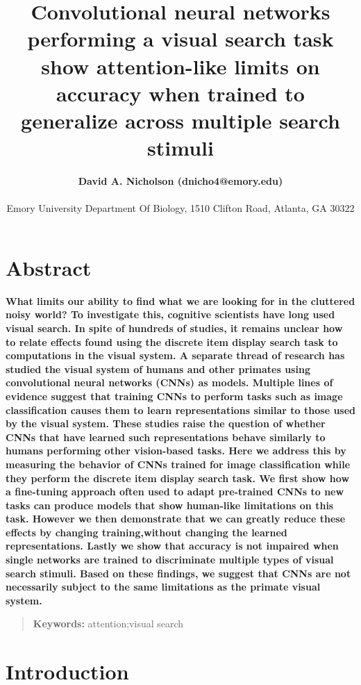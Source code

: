 \documentclass[10pt,letterpaper]{article}
\title{Convolutional neural networks performing a visual search task show attention-like 
limits on accuracy when trained to generalize across multiple search stimuli}
\author{{\large \bf David A. Nicholson (dnicho4@emory.edu)} \\
  \AND {\large \bf Astrid A. Prinz (astrid.prinz@emory.edu)} \\
  Emory University Department Of Biology, 1510 Clifton Road, Atlanta, GA 30322}
\begin{document}
\maketitle

\section{Abstract}
{
\bf
What limits our ability to find what we are looking for in the cluttered noisy world? To investigate this, cognitive scientists have long used visual search. In spite of hundreds of studies, it remains unclear how to relate effects found using the discrete item display search task to computations in the visual system. A separate thread of research has studied the visual system of humans and other primates using convolutional neural networks (CNNs) as models. Multiple lines of evidence suggest that training CNNs to perform tasks such as image classification causes them to learn  representations similar to those used by the visual system. These studies raise the question of whether CNNs that have learned such representations behave similarly to humans performing other vision-based tasks. Here we address this by measuring the behavior of CNNs trained for image classification while they perform the discrete item display search task. We first show how a fine-tuning approach often used to adapt pre-trained CNNs to new tasks can produce models that show human-like limitations on this task. However we then demonstrate that we can greatly reduce these effects by changing training,without changing the learned representations. Lastly we show that accuracy is not impaired when single networks are trained to discriminate multiple types of visual search stimuli. Based on these findings, we suggest that CNNs are not necessarily subject to the same limitations as the primate visual system.
}
\begin{quote}
\small
\textbf{Keywords:} 
attention;visual search
\end{quote}

\section{Introduction}
\end{document}
